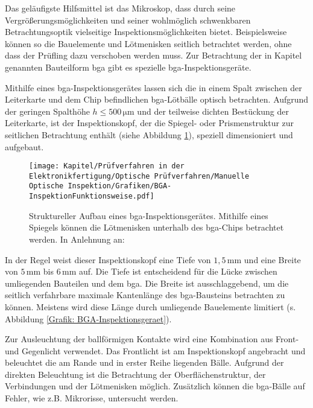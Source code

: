         Das geläufigste Hilfsmittel ist das Mikroskop, dass durch seine Vergrößerungsmöglichkeiten und seiner wohlmöglich schwenkbaren Betrachtungsoptik vielseitige Inspektionsmöglichkeiten bietet.
        Beispielsweise können so die Bauelemente und Lötmenisken seitlich betrachtet werden, ohne dass der Prüfling dazu verschoben werden muss.
        Zur Betrachtung der in Kapitel  genannten Bauteilform \ac{bga} gibt es spezielle \ac{bga}-Inspektionsgeräte. \cite{berger_test-_2012}

        Mithilfe eines \ac{bga}-Inspektionsgerätes lassen sich die in einem Spalt zwischen der Leiterkarte und dem Chip befindlichen \ac{bga}-Lötbälle optisch betrachten.
        Aufgrund der geringen Spalthöhe $h \leq 500\,\si{\micro\metre}$ und der teilweise dichten Bestückung der Leiterkarte, ist der Inspektionskopf, der die Spiegel- oder Prismenstruktur zur seitlichen Betrachtung enthält (siehe Abbildung \ref{Grafik: BGA-InspektionFunktionsweise}), speziell dimensioniert und aufgebaut. \cite{berger_test-_2012}

        \begin{figure}[htbp]
            \centering
            \texttt{[image: Kapitel/Prüfverfahren in der Elektronikfertigung/Optische Prüfverfahren/Manuelle Optische Inspektion/Grafiken/BGA-InspektionFunktionsweise.pdf]}
            \caption[Struktureller Aufbau eines \acs{bga}-Inspektionsgerätes]{Struktureller Aufbau eines \acs{bga}-Inspektionsgerätes. Mithilfe eines Spiegels können die Lötmenisken unterhalb des \acs{bga}-Chips betrachtet werden. In Anlehnung an: \cite{berger_test-_2012}}
            \label{Grafik: BGA-InspektionFunktionsweise}
        \end{figure}

        In der Regel weist dieser Inspektionskopf eine Tiefe von $1,5\,\si{\milli\metre}$ und eine Breite von $5\,\si{\milli\metre}$ bis $6\,\si{\milli\metre}$ auf.
        Die Tiefe ist entscheidend für die Lücke zwischen umliegenden Bauteilen und dem \ac{bga}.
        Die Breite ist ausschlaggebend, um die seitlich verfahrbare maximale Kantenlänge des \ac{bga}-Bausteins betrachten zu können.
        Meistens wird diese Länge durch umliegende Bauelemente limitiert (s. Abbildung \ref{Grafik: BGA-Inspektionsgeraet}). \cite{berger_test-_2012}

        Zur Ausleuchtung der ballförmigen Kontakte wird eine Kombination aus Front- und Gegenlicht verwendet.
        Das Frontlicht ist am Inspektionskopf angebracht und beleuchtet die am Rande und in erster Reihe liegenden Bälle.
        Aufgrund der direkten Beleuchtung ist die Betrachtung der Oberflächenstruktur, der Verbindungen und der Lötmenisken möglich.
        Zusätzlich können die \ac{bga}-Bälle auf Fehler, wie z.B. Mikrorisse, untersucht werden.  \cite{berger_test-_2012}

